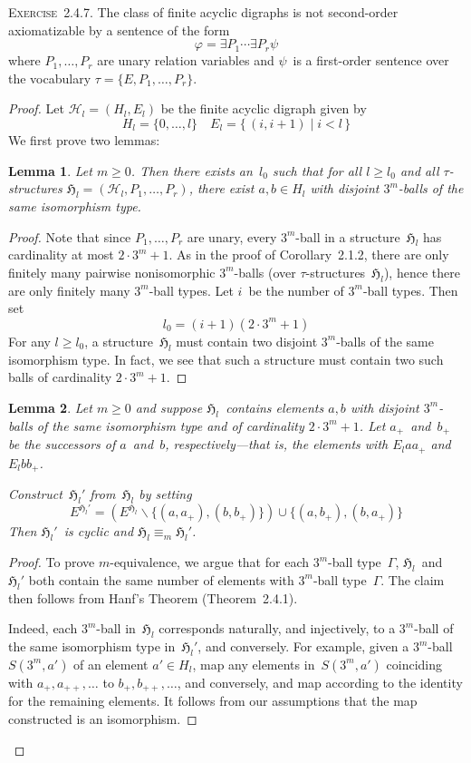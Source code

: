 \documentclass[letterpaper]{article}
\renewcommand{\H}{\mathcal{H}}
\newcommand{\Hx}{\mathfrak{H}}
\newcommand{\union}{\cup}
\newcommand{\diff}{\mathrel{\backslash}}
\newcommand{\exercise}[1]{\noindent\textsc{Exercise~{#1}.}}
\theoremstyle{plain}
\newtheorem*{lem}{Lemma}
\begin{document}
\exercise{2.4.7}
The class of finite acyclic digraphs is not second-order axiomatizable by a sentence of the form
$$\varphi=\exists P_1\cdots\exists P_r\psi$$
where $P_1,\ldots,P_r$ are unary relation variables and $\psi$~is a first-order sentence over the vocabulary $\tau=\{E,P_1,\ldots,P_r\}$.
\begin{proof}
Let $\H_l=(H_l,E_l)$ be the finite acyclic digraph given by
$$H_l=\{0,\ldots,l\}\quad E_l=\{\,(i,i+1)\mid i<l\,\}$$
We first prove two lemmas:
\begin{lem}
Let $m\ge0$. Then there exists an~$l_0$ such that for all $l\ge l_0$ and all $\tau$-structures $\Hx_l=(\H_l,P_1,\ldots,P_r)$, there exist $a,b\in H_l$ with disjoint $3^m$-balls of the same isomorphism type.
\end{lem}
\begin{proof}
Note that since $P_1,\ldots,P_r$ are unary, every $3^m$-ball in a structure~$\Hx_l$ has cardinality at most $2\cdot3^m+1$. As in the proof of Corollary~2.1.2, there are only finitely many pairwise nonisomorphic $3^m$-balls (over $\tau$-structures~$\Hx_l$), hence there are only finitely many $3^m$-ball types. Let $i$~be the number of $3^m$-ball types. Then set
$$l_0=(i+1)(2\cdot3^m+1)$$
For any $l\ge l_0$, a structure~$\Hx_l$ must contain two disjoint $3^m$-balls of the same isomorphism type. In fact, we see that such a structure must contain two such balls of cardinality $2\cdot3^m+1$.
\end{proof}
\begin{lem}
Let $m\ge0$ and suppose $\Hx_l$~contains elements $a,b$ with disjoint $3^m$-balls of the same isomorphism type and of cardinality $2\cdot3^m+1$. Let $a_+$~and~$b_+$ be the successors of $a$~and~$b$, respectively---that is, the elements with $E_laa_+$ and $E_lbb_+$.

Construct~$\Hx_l'$ from~$\Hx_l$ by setting
$$E^{\Hx_l'}=(E^{\Hx_l}\diff\{(a,a_+),(b,b_+)\})\union\{(a,b_+),(b,a_+)\}$$
Then $\Hx_l'$~is cyclic and $\Hx_l\equiv_m\Hx_l'$.
\end{lem}
\begin{proof}
To prove $m$-equivalence, we argue that for each $3^m$-ball type~$\Gamma$, $\Hx_l$~and~$\Hx_l'$ both contain the same number of elements with $3^m$-ball type~$\Gamma$. The claim then follows from Hanf's Theorem (Theorem~2.4.1).

Indeed, each $3^m$-ball in~$\Hx_l$ corresponds naturally, and injectively, to a $3^m$-ball of the same isomorphism type in~$\Hx_l'$, and conversely. For example, given a $3^m$-ball~$S(3^m,a')$ of an element $a'\in H_l$, map any elements in~$S(3^m,a')$ coinciding with $a_+,a_{++},\ldots$ to $b_+,b_{++},\ldots$, and conversely, and map according to the identity for the remaining elements. It follows from our assumptions that the map constructed is an isomorphism.


\end{proof}
\end{proof}
\end{document}
